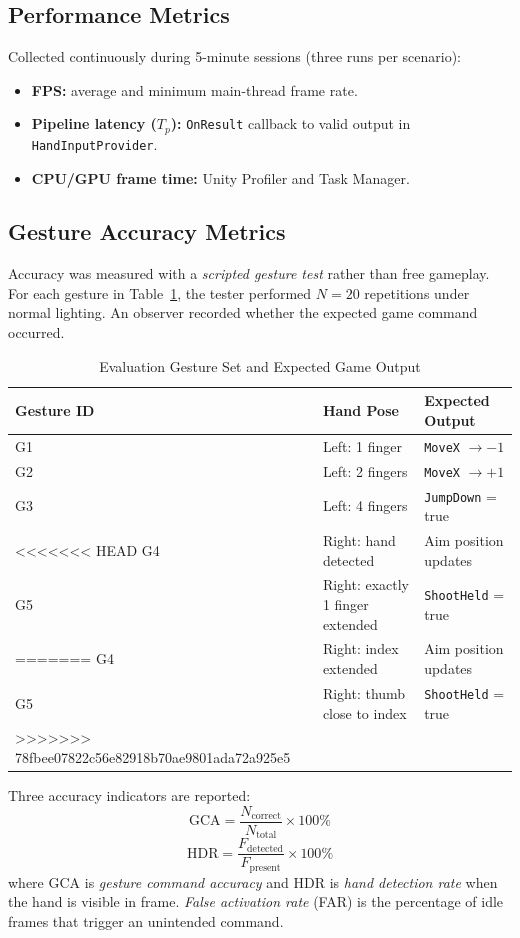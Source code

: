 \documentclass[journal,onecolumn,12pt,draftclsnofoot]{IEEEtran}
\begin{document}
\begin{itemize}
\subsection{Performance Metrics}
Collected continuously during 5-minute sessions (three runs per scenario):
\begin{itemize}
\item \textbf{FPS:} average and minimum main-thread frame rate.
\item \textbf{Pipeline latency ($T_p$):} \texttt{OnResult} callback to valid output in \texttt{HandInputProvider}.
\item \textbf{CPU/GPU frame time:} Unity Profiler and Task Manager.
\end{itemize}

\subsection{Gesture Accuracy Metrics}
Accuracy was measured with a \textit{scripted gesture test} rather than free gameplay. For each gesture in Table~\ref{tab:gestures}, the tester performed $N=20$ repetitions under normal lighting. An observer recorded whether the expected game command occurred.

\begin{table}[htbp]
\caption{Evaluation Gesture Set and Expected Game Output}
\centering
\begin{tabular}{|l|l|l|}
\hline
\textbf{Gesture ID} & \textbf{Hand Pose} & \textbf{Expected Output} \\
\hline
G1 & Left: 1 finger & \texttt{MoveX} $\rightarrow -1$ \\
G2 & Left: 2 fingers & \texttt{MoveX} $\rightarrow +1$ \\
G3 & Left: 4 fingers & \texttt{JumpDown} = true \\
<<<<<<< HEAD
G4 & Right: hand detected & Aim position updates \\
G5 & Right: exactly 1 finger extended & \texttt{ShootHeld} = true \\
=======
G4 & Right: index extended & Aim position updates \\
G5 & Right: thumb close to index & \texttt{ShootHeld} = true \\
>>>>>>> 78fbee07822c56e82918b70ae9801ada72a925e5
\hline
\end{tabular}
\label{tab:gestures}
\end{table}

Three accuracy indicators are reported:
\begin{equation}
\text{GCA} = \frac{N_{\text{correct}}}{N_{\text{total}}} \times 100\%
\label{eq:gca}
\end{equation}
\begin{equation}
\text{HDR} = \frac{F_{\text{detected}}}{F_{\text{present}}} \times 100\%
\label{eq:hdr}
\end{equation}
where GCA is \textit{gesture command accuracy} and HDR is \textit{hand detection rate} when the hand is visible in frame. \textit{False activation rate} (FAR) is the percentage of idle frames that trigger an unintended command.


\end{itemize}
\end{document}
